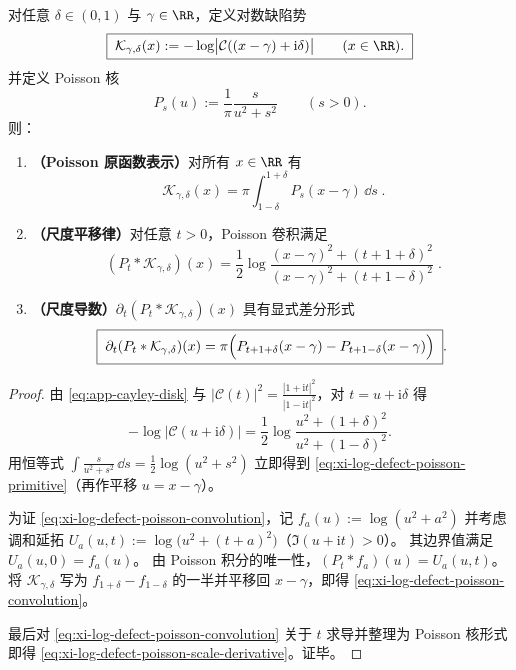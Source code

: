\begin{proposition}\label{prop:xi-log-defect-potential-poisson-primitive}
对任意 \(\delta\in(0,1)\) 与 \(\gamma\in\RR\)，定义对数缺陷势
\begin{equation}\label{eq:xi-log-defect-potential}
\boxed{\;
\mathcal{K}_{\gamma,\delta}(x):=-\log\bigl|\mathcal{C}((x-\gamma)+\mathrm{i}\delta)\bigr|\qquad(x\in\RR).\;}
\end{equation}
并定义 Poisson 核
\[
P_s(u):=\frac{1}{\pi}\frac{s}{u^2+s^2}\qquad(s>0).
\]
则：
\begin{enumerate}
  \item \textbf{（Poisson 原函数表示）}对所有 \(x\in\RR\) 有
  \begin{equation}\label{eq:xi-log-defect-poisson-primitive}
  \boxed{\;
  \mathcal{K}_{\gamma,\delta}(x)
  =\pi\int_{1-\delta}^{1+\delta}P_s(x-\gamma)\,\dd s\; }.
  \end{equation}
  \item \textbf{（尺度平移律）}对任意 \(t>0\)，Poisson 卷积满足
  \begin{equation}\label{eq:xi-log-defect-poisson-convolution}
  \boxed{\;
  (P_t*\mathcal{K}_{\gamma,\delta})(x)
  =\frac12\log\frac{(x-\gamma)^2+(t+1+\delta)^2}{(x-\gamma)^2+(t+1-\delta)^2}\; }.
  \end{equation}
  \item \textbf{（尺度导数）}\(\partial_t(P_t*\mathcal{K}_{\gamma,\delta})(x)\) 具有显式差分形式
  \begin{equation}\label{eq:xi-log-defect-poisson-scale-derivative}
  \boxed{\;
  \partial_t(P_t*\mathcal{K}_{\gamma,\delta})(x)
  =\pi\Bigl(P_{t+1+\delta}(x-\gamma)-P_{t+1-\delta}(x-\gamma)\Bigr)\; }.
  \end{equation}
\end{enumerate}
\end{proposition}
\begin{proof}
由 \eqref{eq:app-cayley-disk} 与 \(|\mathcal{C}(t)|^2=\frac{|1+\mathrm{i}t|^2}{|1-\mathrm{i}t|^2}\)，对 \(t=u+\mathrm{i}\delta\) 得
\[
-\log|\mathcal{C}(u+\mathrm{i}\delta)|
=\frac12\log\frac{u^2+(1+\delta)^2}{u^2+(1-\delta)^2}.
\]
用恒等式 \(\int \frac{s}{u^2+s^2}\,\dd s=\frac12\log(u^2+s^2)\) 立即得到 \eqref{eq:xi-log-defect-poisson-primitive}（再作平移 \(u=x-\gamma\)）。
\par
为证 \eqref{eq:xi-log-defect-poisson-convolution}，记 \(f_a(u):=\log(u^2+a^2)\) 并考虑调和延拓
\(
U_a(u,t):=\log\bigl(u^2+(t+a)^2\bigr)
\)（\(\Im(u+\mathrm{i}t)>0\)）。
其边界值满足 \(U_a(u,0)=f_a(u)\)。
由 Poisson 积分的唯一性，\((P_t*f_a)(u)=U_a(u,t)\)。
将 \(\mathcal{K}_{\gamma,\delta}\) 写为 \(f_{1+\delta}-f_{1-\delta}\) 的一半并平移回 \(x-\gamma\)，即得 \eqref{eq:xi-log-defect-poisson-convolution}。
\par
最后对 \eqref{eq:xi-log-defect-poisson-convolution} 关于 \(t\) 求导并整理为 Poisson 核形式即得 \eqref{eq:xi-log-defect-poisson-scale-derivative}。证毕。
\end{proof}

